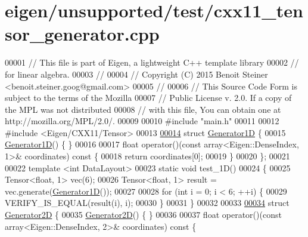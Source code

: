 \hypertarget{eigen_2unsupported_2test_2cxx11__tensor__generator_8cpp_source}{}\section{eigen/unsupported/test/cxx11\+\_\+tensor\+\_\+generator.cpp}
\label{eigen_2unsupported_2test_2cxx11__tensor__generator_8cpp_source}

\begin{DoxyCode}
00001 \textcolor{comment}{// This file is part of Eigen, a lightweight C++ template library}
00002 \textcolor{comment}{// for linear algebra.}
00003 \textcolor{comment}{//}
00004 \textcolor{comment}{// Copyright (C) 2015 Benoit Steiner <benoit.steiner.goog@gmail.com>}
00005 \textcolor{comment}{//}
00006 \textcolor{comment}{// This Source Code Form is subject to the terms of the Mozilla}
00007 \textcolor{comment}{// Public License v. 2.0. If a copy of the MPL was not distributed}
00008 \textcolor{comment}{// with this file, You can obtain one at http://mozilla.org/MPL/2.0/.}
00009 
00010 \textcolor{preprocessor}{#include "main.h"}
00011 
00012 \textcolor{preprocessor}{#include <Eigen/CXX11/Tensor>}
00013 
\hyperlink{struct_generator1_d}{00014} \textcolor{keyword}{struct }\hyperlink{struct_generator1_d}{Generator1D} \{
00015   \hyperlink{struct_generator1_d}{Generator1D}() \{ \}
00016 
00017   \textcolor{keywordtype}{float} operator()(\textcolor{keyword}{const} array<Eigen::DenseIndex, 1>& coordinates)\textcolor{keyword}{ const }\{
00018     \textcolor{keywordflow}{return} coordinates[0];
00019   \}
00020 \};
00021 
00022 \textcolor{keyword}{template} <\textcolor{keywordtype}{int} DataLayout>
00023 \textcolor{keyword}{static} \textcolor{keywordtype}{void} test\_1D()
00024 \{
00025   Tensor<float, 1> vec(6);
00026   Tensor<float, 1> result = vec.generate(\hyperlink{struct_generator1_d}{Generator1D}());
00027 
00028   \textcolor{keywordflow}{for} (\textcolor{keywordtype}{int} i = 0; i < 6; ++i) \{
00029     VERIFY\_IS\_EQUAL(result(i), i);
00030   \}
00031 \}
00032 
00033 
\hyperlink{struct_generator2_d}{00034} \textcolor{keyword}{struct }\hyperlink{struct_generator2_d}{Generator2D} \{
00035   \hyperlink{struct_generator2_d}{Generator2D}() \{ \}
00036 
00037   \textcolor{keywordtype}{float} operator()(\textcolor{keyword}{const} array<Eigen::DenseIndex, 2>& coordinates)\textcolor{keyword}{ const }\{

\end{DoxyCode}
